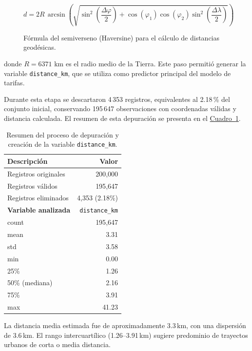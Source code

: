 \documentclass[10pt]{article}
\newcommand{\cuadroref}[1]{\hyperref[#1]{Cuadro~\ref*{#1}}}
\begin{document}
	\begin{figure}[!htbp]
		\centering
		\[
		d = 2R\, \arcsin\!\left(
		\sqrt{
			\sin^2\!\left(\frac{\Delta\varphi}{2}\right)
			+ \cos(\varphi_1)\cos(\varphi_2)
			\sin^2\!\left(\frac{\Delta\lambda}{2}\right)
		}
		\right)
		\]
		\caption{Fórmula del semiverseno (Haversine) para el cálculo de distancias geodésicas.}
		\label{eq:haversine}
	\end{figure}

	donde $R=6371$ km es el radio medio de la Tierra. Este paso permitió generar la variable \texttt{distance\_km}, que se utiliza como predictor principal del modelo de tarifas.

	Durante esta etapa se descartaron 4\,353 registros, equivalentes al 2.18\,\% del conjunto inicial, conservando 195\,647 observaciones con coordenadas válidas y distancia calculada. El resumen de esta depuración se presenta en el \cuadroref{tab:depuracion_distance}.

	\begin{table}[!htbp]
		\centering
		\caption{Resumen del proceso de depuración y creación de la variable \texttt{distance\_km}.}
		\label{tab:depuracion_distance}
		\begin{tabular}{lr}
			\hline
			\textbf{Descripción} & \textbf{Valor} \\
			\hline
			Registros originales & 200{,}000 \\
			Registros válidos & 195{,}647 \\
			Registros eliminados & 4{,}353 (2.18\%) \\
			\hline
			\textbf{Variable analizada} & \texttt{distance\_km} \\
			\hline
			count & 195{,}647 \\
			mean & 3.31 \\
			std & 3.58 \\
			min & 0.00 \\
			25\% & 1.26 \\
			50\% (mediana) & 2.16 \\
			75\% & 3.91 \\
			max & 41.23 \\
			\hline
		\end{tabular}
	\end{table}

	La distancia media estimada fue de aproximadamente 3.3\,km, con una dispersión de 3.6\,km. El rango intercuartílico (1.26–3.91\,km) sugiere predominio de trayectos urbanos de corta o media distancia.
\end{document}
